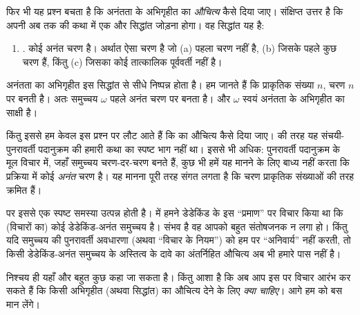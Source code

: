 \documentclass[../../../include/open-logic-section]{subfiles}
\begin{document}
फिर भी यह प्रश्न बचता है कि अनंतता के अभिगृहीत का \emph{औचित्य} कैसे दिया
जाए। संक्षिप्त उत्तर है कि अपनी अब तक की कथा में एक और सिद्धांत जोड़ना
होगा। वह सिद्धांत यह है:
\begin{enumerate}
	\item[] \stagesinf. कोई अनंत चरण है। अर्थात ऐसा चरण है जो (a) पहला चरण
	नहीं है, (b) जिसके पहले कुछ चरण हैं, किंतु (c) जिसका कोई तात्कालिक
	पूर्ववर्ती नहीं है।
\end{enumerate}
अनंतता का अभिगृहीत इस सिद्धांत से सीधे निष्पन्न होता है। हम जानते हैं कि
प्राकृतिक संख्या $n$, चरण $n$ पर बनती है। अतः समुच्चय $\omega$ पहले अनंत
चरण पर बनता है। और $\omega$ स्वयं अनंतता के अभिगृहीत का साक्षी है।

किंतु इससे हम केवल इस प्रश्न पर लौट आते हैं कि \stagesinf{} का औचित्य कैसे
दिया जाए। \stagessucc{} की तरह यह संचयी-पुनरावर्ती पदानुक्रम की हमारी कथा
का स्पष्ट भाग नहीं था। इससे भी अधिक: पुनरावर्ती पदानुक्रम के मूल विचार में,
जहाँ समुच्चय चरण-दर-चरण बनते हैं, कुछ भी हमें यह मानने के लिए बाध्य नहीं
करता कि प्रक्रिया में कोई \emph{अनंत} चरण है। यह मानना पूरी तरह संगत लगता
है कि चरण प्राकृतिक संख्याओं की तरह क्रमित हैं।

पर इससे एक स्पष्ट समस्या उत्पन्न होती है।
 में हमने डेडेकिंड के इस ``प्रमाण''
पर विचार किया था कि (विचारों का) कोई डेडेकिंड-अनंत समुच्चय है। संभव है वह
आपको बहुत संतोषजनक न लगा हो। किंतु यदि समुच्चय की पुनरावर्ती अवधारणा (अथवा
``विचार के नियम'') \stagesinf{} को हम पर ``अनिवार्य'' नहीं करती, तो किसी
डेडेकिंड-अनंत समुच्चय के अस्तित्व के दावे का अंतर्निहित औचित्य अब भी हमारे
पास नहीं है।

निश्चय ही यहाँ और बहुत कुछ कहा जा सकता है। किंतु आशा है कि अब आप इस पर
विचार आरंभ कर सकते हैं कि किसी अभिगृहीत (अथवा सिद्धांत) का औचित्य देने के
लिए \emph{क्या चाहिए}। आगे हम \stagesinf{} को बस मान लेंगे।
\end{document}
